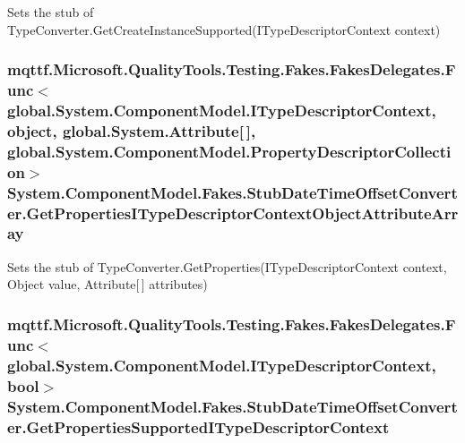 Sets the stub of Type\-Converter.\-Get\-Create\-Instance\-Supported(\-I\-Type\-Descriptor\-Context context)

\hypertarget{class_system_1_1_component_model_1_1_fakes_1_1_stub_date_time_offset_converter_a0aaecf5b5d58a2a12411779ce11a3b97}{
\subsubsection[{Get\-Properties\-I\-Type\-Descriptor\-Context\-Object\-Attribute\-Array}]{\setlength{\rightskip}{0pt plus 5cm}mqttf.\-Microsoft.\-Quality\-Tools.\-Testing.\-Fakes.\-Fakes\-Delegates.\-Func$<$global.\-System.\-Component\-Model.\-I\-Type\-Descriptor\-Context, object, global.\-System.\-Attribute\mbox{[}$\,$\mbox{]}, global.\-System.\-Component\-Model.\-Property\-Descriptor\-Collection$>$ System.\-Component\-Model.\-Fakes.\-Stub\-Date\-Time\-Offset\-Converter.\-Get\-Properties\-I\-Type\-Descriptor\-Context\-Object\-Attribute\-Array}}\label{class_system_1_1_component_model_1_1_fakes_1_1_stub_date_time_offset_converter_a0aaecf5b5d58a2a12411779ce11a3b97}


Sets the stub of Type\-Converter.\-Get\-Properties(\-I\-Type\-Descriptor\-Context context, Object value, Attribute\mbox{[}$\,$\mbox{]} attributes)

\hypertarget{class_system_1_1_component_model_1_1_fakes_1_1_stub_date_time_offset_converter_a4b19d8dc4b01bcafdb8f0e70f2400dfd}{
\subsubsection[{Get\-Properties\-Supported\-I\-Type\-Descriptor\-Context}]{\setlength{\rightskip}{0pt plus 5cm}mqttf.\-Microsoft.\-Quality\-Tools.\-Testing.\-Fakes.\-Fakes\-Delegates.\-Func$<$global.\-System.\-Component\-Model.\-I\-Type\-Descriptor\-Context, bool$>$ System.\-Component\-Model.\-Fakes.\-Stub\-Date\-Time\-Offset\-Converter.\-Get\-Properties\-Supported\-I\-Type\-Descriptor\-Context}}\label{class_system_1_1_component_model_1_1_fakes_1_1_stub_date_time_offset_converter_a4b19d8dc4b01bcafdb8f0e70f2400dfd}


